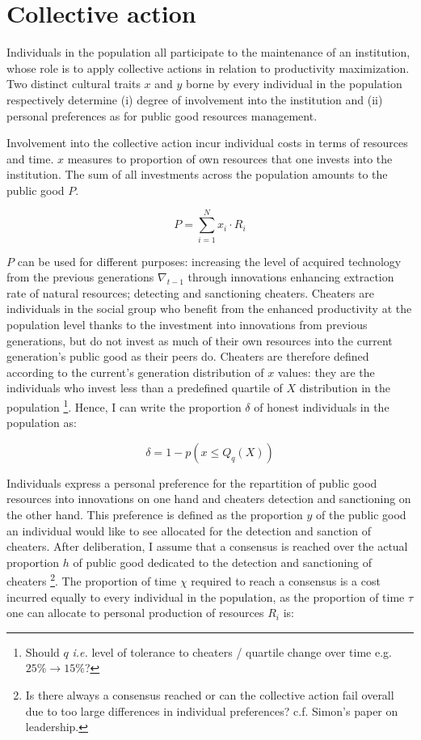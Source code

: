 \documentclass[a4paper]{article}
\begin{document}
\section{Collective action}
\label{sec:collact}

Individuals in the population all participate to the maintenance of an institution, whose role is to apply collective actions in relation to productivity maximization. Two distinct cultural traits $x$ and $y$ borne by every individual in the population respectively determine (i) degree of involvement into the institution and (ii) personal preferences as for public good resources management.     

Involvement into the collective action incur individual costs in terms of resources and time. $x$ measures to proportion of own resources that one invests into the institution. The sum of all investments across the population amounts to the public good $P$. 

\begin{equation} \label{eq:pubgood}
P = \sum_{i=1}^{N}x_i\cdot R_i
\end{equation}

$P$ can be used for different purposes: increasing the level of acquired technology from the previous generations $\nabla_{t-1}$ through innovations enhancing extraction rate of natural resources; detecting and sanctioning cheaters. Cheaters are individuals in the social group who benefit from the enhanced productivity at the population level thanks to the investment into innovations from previous generations, but do not invest as much of their own resources into the current generation's public good as their peers do. Cheaters are therefore defined according to the current's generation distribution of $x$ values: they are the individuals who invest less than a predefined quartile of $X$ distribution in the population \footnote{Should $q$ \textit{i.e.} level of tolerance to cheaters / quartile change over time e.g. $25\%\to15\%$?}. Hence, I can write the proportion $\delta$ of honest individuals in the population as:

\begin{equation} \label{eq:cheat}
\delta=1-p(x\le Q_q\left(X\right))
\end{equation}

Individuals express a personal preference for the repartition of public good resources into innovations on one hand and cheaters detection and sanctioning on the other hand. This preference is defined as the proportion $y$ of the public good an individual would like to see allocated for the detection and sanction of cheaters. After deliberation, I assume that a consensus is reached over the actual proportion $h$ of public good dedicated to the detection and sanctioning of cheaters \footnote{Is there always a consensus reached or can the collective action fail overall due to too large differences in individual preferences? c.f. Simon's paper on leadership.}. The proportion of time $\chi$ required to reach a consensus is a cost incurred equally to every individual in the population, as the proportion of time $\tau$ one can allocate to personal production of resources $R_i$ is: 
\end{document}
